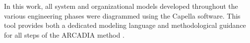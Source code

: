 \documentclass[conference]{IEEEtran}
\begin{document}
In this work, all system and organizational models developed
throughout the various engineering phases
were diagrammed using the Capella software.
This tool provides both a dedicated modeling language and methodological guidance for all
steps of the ARCADIA method \cite{Roques2018}.

\end{document}
